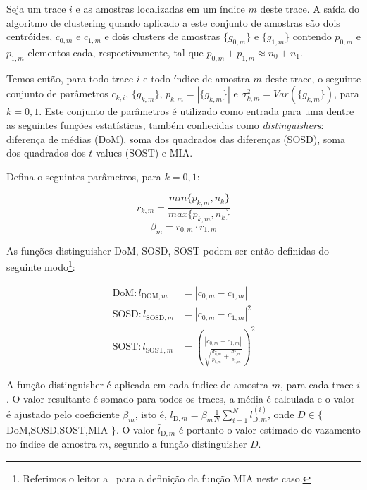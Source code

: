 Seja um trace $i$ e as amostras localizadas em um índice $m$ deste trace. A saída do algoritmo de clustering quando aplicado a este conjunto de amostras são dois centróides, $c_{0,m}$ e $c_{1,m}$ e dois clusters de amostras $\{g_{0,m}\}$ e $\{g_{1,m}\}$ contendo $p_{0,m}$ e $p_{1,m}$ elementos cada, respectivamente, tal que $p_{0,m} + p_{1,m}\approx n_0 + n_1$.

Temos então, para todo trace $i$ e todo índice de amostra $m$ deste trace, o seguinte conjunto de parâmetros $c_{k,i}$, $\{g_{k,m}\}$, $p_{k,m} = |\{g_{k,m}\}|$ e $\sigma^2_{k,m} = Var(\{g_{k,m}\})$, para $k = 0,1$. Este conjunto de parâmetros é utilizado como entrada para uma dentre as seguintes funções estatísticas, também conhecidas como \textit{distinguishers}: diferença de médias (DoM), soma dos quadrados das diferenças (SOSD), soma dos quadrados dos $t$-values (SOST) e MIA.

Defina o seguintes parâmetros, para $k=0,1$:

\begin{equation}	r_{k,m} = \frac{min\{p_{k,m}, n_k\} }{ max\{p_{k,m}, n_k\}}	\end{equation}
\begin{equation}	\beta_{m} = r_{0,m} \cdot r_{1,m}	\end{equation}

As funções distinguisher DoM, SOSD, SOST podem ser então definidas do seguinte modo\footnote{Referimos o leitor a~\cite{PerinChmielewski2015} para a definição da função MIA neste caso.}:

\begin{align*}
	\text{DoM}: l_{\text{DOM}, m} 	&= |c_{0,m} - c_{1,m}| \\
	\text{SOSD}: l_{\text{SOSD}, m} &= |c_{0,m} - c_{1,m}|^2 \\
	\text{SOST}: l_{\text{SOST}, m} &= \left( \frac{|c_{0,m} - c_{1,m}|} {\sqrt{ \frac{\sigma^2_{0,m}}{p_{0,m}} + \frac{\sigma^2_{1,m}}{p_{1,m}} }}   \right) ^ 2
\end{align*}

A função distinguisher é aplicada em cada índice de amostra $m$, para cada trace $i$. O valor resultante é somado para todos os traces, a média é calculada e o valor é ajustado pelo coeficiente $\beta_{m}$, isto é, $\bar{l}_{\text{D}, m} = \beta_{m} \frac{1}{N} \sum_{i=1}^{N} l^{(i)}_{\text{D}, m}$, onde $D \in \{$ DoM,SOSD,SOST,MIA $\}$. O valor $\bar{l}_{\text{D}, m}$ é portanto o valor estimado do vazamento no índice de amostra $m$, segundo a função distinguisher $D$.

